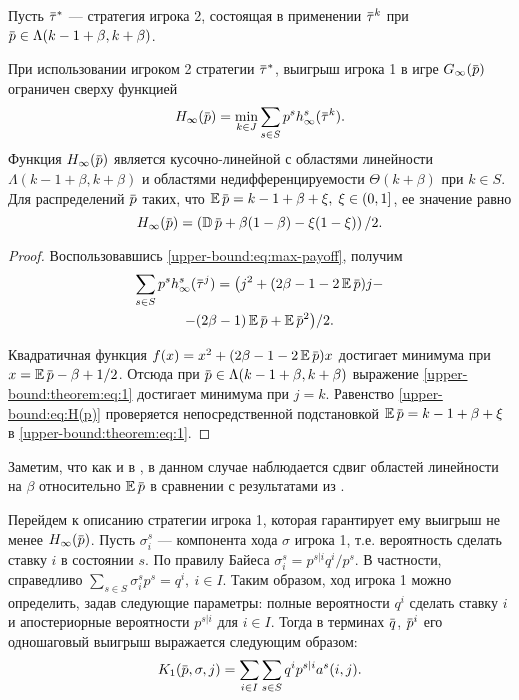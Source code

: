 {Пусть $\tauv^*$ --- стратегия игрока 2, состоящая в применении $\tauv^k$ при $\p
\in \Lambda(k-1+\beta,k+\beta)$.

\begin{theorem}
  \label{upper-bound:theorem}
  При использовании игроком 2 стратегии $\tauv^*$, выигрыш игрока 1 в игре
  $\theGame[\infty](\p)$ ограничен сверху функцией
  \begin{equation*}
    \High(\p) = \min_{k \in J} \sum_{s \in S} p^s  h^s_\infty(\tauv^k).
  \end{equation*}
  Функция $\High(\p)$ является кусочно-линейной с областями линейности
  $\Lambda(k - 1 + \beta, k + \beta)$ и областями недифференцируемости
  $\Theta(k+\beta)$ при $k \in S$. Для распределений $\p$ таких, что $\E \p = k
  - 1 + \beta + \xi, \; \xi \in (0, 1]$, ее значение равно
  \begin{equation}
    \label{upper-bound:eq:H(p)}
    \High(\p) = \left( \D \p + \beta(1-\beta) - \xi(1-\xi) \right)/2.
  \end{equation}
\end{theorem}
\begin{proof}
  Воспользовавшись \eqref{upper-bound:eq:max-payoff}, получим
  \begin{equation}
    \label{upper-bound:theorem:eq:1}
    \begin{gathered}
    \sum_{s \in S} p^s h^s_\infty(\tauv^j) = \bigl(
      j^2 + (2\beta - 1 - 2 \E \p)j - \\
      - (2\beta - 1) \E \p + \E \p^2 
    \bigr)/2.
    \end{gathered}
  \end{equation}
  
  Квадратичная функция $f(x) = x^2 + (2\beta - 1 - 2\E \p)x$ достигает минимума
  при $x = \E \p - \beta + 1/2$. Отсюда при $\p \in \Lambda(k - 1 + \beta, k +
  \beta)$ выражение \eqref{upper-bound:theorem:eq:1} достигает минимума при $j =
  k$. Равенство \eqref{upper-bound:eq:H(p)} проверяется непосредственной
  подстановкой $\E \p = k - 1 + \beta + \xi$ в \eqref{upper-bound:theorem:eq:1}.
\end{proof}

Заметим, что как и в \cite{pyanykh16:discr:ru}, в данном случае наблюдается сдвиг
областей линейности на $\beta$ относительно $\E \p$ в сравнении с результатами
из \cite{domansky11}.

Перейдем к описанию стратегии игрока 1, которая гарантирует ему выигрыш не менее
$\High(\p)$. Пусть $\sigma^s_i$ --- компонента хода $\sigma$ игрока 1, т.е.
вероятность сделать ставку $i$ в состоянии $s$. По правилу Байеса $\sigma^s_i =
p^{s|i} q^i / p^s$. В частности, справедливо $\sum_{s \in S} \sigma^s_i p^s =
q^i,\ i \in I$. Таким образом, ход игрока 1 можно определить, задав следующие
параметры: полные вероятности $q^i$ сделать ставку $i$ и апостериорные
вероятности $p^{s|i}$ для $i \in I$. Тогда в терминах $\q$, $\p^i$ его
одношаговый выигрыш выражается следующим образом:
\begin{equation}
  \label{lower-bound:eq:K1(q,pi)}
  \K[1](\p, \sigma, j) = \sum_{i \in I} \sum_{s \in S} q^i p^{s|i} a^s(i, j).
\end{equation}

}
